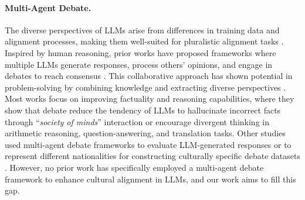 \paragraph{Multi-Agent Debate.}
The diverse perspectives of LLMs arise from differences in training data and alignment processes, making them well-suited for pluralistic alignment tasks \cite{modular}. Inspired by human reasoning, prior works have proposed frameworks where multiple LLMs generate responses, process others' opinions, and engage in debates to reach consensus \cite{estornell2024multillm}. This collaborative approach has shown potential in problem-solving by combining knowledge and extracting diverse perspectives \cite{farperspective}. Most works focus on improving factuality and reasoning capabilities, where they show that debate reduce the tendency of LLMs to hallucinate incorrect facts through ``\textit{society of minds}'' interaction \cite{du2023improvingfactualityreasoninglanguage} or encourage divergent thinking \cite{liang-etal-2024-encouraging} in arithmetic reasoning, question-answering, and translation tasks. Other studies used multi-agent debate frameworks to evaluate LLM-generated responses \cite{chateval} or to represent different nationalities for constructing culturally specific debate datasets \cite{culturepark}. However, no prior work has specifically employed a multi-agent debate framework to enhance cultural alignment in LLMs, and our work aims to fill this gap.

